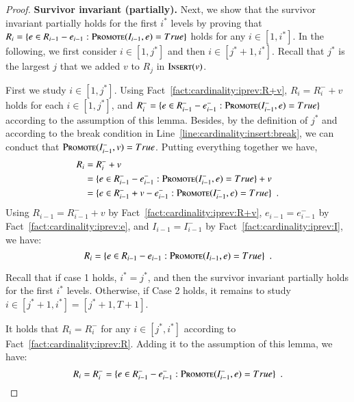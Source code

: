 \documentclass[11pt]{article}
\newcommand{\replacementTester}{\textsc{Promote}}
\newcommand{\insertv}{{\textsc{Insert}}}
\begin{document}
\begin{proof}
\textbf{Survivor invariant (partially). }
Next, we show that the survivor invariant partially holds for the first $i^*$ levels by proving that $R_i=\{ e \in R_{i-1} - e_{i-1}: \replacementTester{}(I_{i-1}, e) = True\}$ holds for any $i\in[1,i^*]$.
In the following, we first consider $i \in [1, j^*]$ and then $i \in [j^*+1, i^*]$.
Recall that $j^*$ is the largest $j$ that we added $v$ to $R_j$ in $\insertv(v)$.

First we study $i \in [1, j^*]$. 
Using Fact~\ref{fact:cardinality:iprev:R+v}, $R_i = R_i^- + v$ holds for each $i \in [1, j^*]$, and $R_i^-=\{ e \in R_{i-1}^- - e_{i-1}^-: \replacementTester{}(I_{i-1}^-, e) =True\}$ according  to the assumption of this lemma. Besides, by the definition of $j^*$  and according to the break condition in Line~\ref{line:cardinality:insert:break}, we can conduct that $\replacementTester{}(I_{i-1}^-, v) = True$. Putting everything together we have,
\begin{align*}
    R_i &= R_i^- + v \\
    &= \{ e \in R_{i-1}^- - e_{i-1}^-: \replacementTester{}(I_{i-1}^-, e) = True\} + v
    \\
    &= \{ e \in R_{i-1}^- + v - e_{i-1}^-: \replacementTester{}(I_{i-1}^-, e) = True\} \enspace.
\end{align*}
Using $R_{i-1}=R_{i-1}^- + v$ by Fact~\ref{fact:cardinality:iprev:R+v}, $e_{i-1}=e_{i-1}^-$ by Fact~\ref{fact:cardinality:iprev:e}, and $I_{i-1}=I_{i-1}^-$ by Fact~\ref{fact:cardinality:iprev:I}, we have: 
$$
R_i = \{ e \in R_{i-1} - e_{i-1}: \replacementTester{}(I_{i-1}, e) = True\} \enspace.
$$

Recall that if case 1 holds, $i^*=j^*$, and then the survivor invariant partially holds for the first $i^*$ levels.
Otherwise, if Case 2 holds, it remains to study $i\in [j^*+1, i^*]=[j^*+1,T+1]$.

It holds that $R_i = R_i^-$ for any $i \in [j^*, i^*]$  according to Fact~\ref{fact:cardinality:iprev:R}. Adding  it to the assumption of this lemma, we have: 
$$
    R_i = R_i^-
    = \{ e \in R_{i-1}^- - e_{i-1}^-: \replacementTester{}(I_{i-1}^-, e) = True\} \enspace .
$$


\end{proof}
\end{document}

